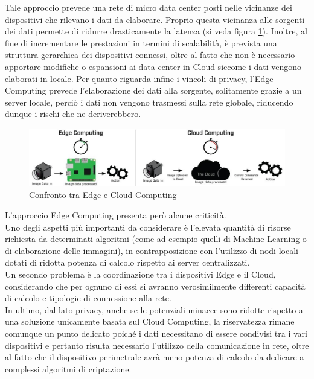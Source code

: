 Tale approccio prevede una rete di micro data center posti nelle vicinanze dei dispositivi che rilevano i dati da elaborare. Proprio questa vicinanza alle sorgenti dei dati permette di ridurre drasticamente la latenza (si veda figura \ref{edgevs}). Inoltre, al fine di incrementare le prestazioni in termini di scalabilità, è prevista una struttura gerarchica dei dispositivi connessi, oltre al fatto che non è necessario apportare modifiche o espansioni ai data center in Cloud siccome i dati vengono elaborati in locale. Per quanto riguarda infine i vincoli di privacy, l'Edge Computing prevede l'elaborazione dei dati alla sorgente, solitamente grazie a un server locale, perciò i dati non vengono trasmessi sulla rete globale, riducendo dunque i rischi che ne deriverebbero.
\begin{figure}[H]
	\centering
	\includegraphics[width=\linewidth, height= 0.15 \textheight]{pics/edgevscloud.jpeg}
	\caption{Confronto tra Edge e Cloud Computing}
	\label{edgevs}
\end{figure}
L'approccio Edge Computing presenta però alcune criticità.\\
Uno degli aspetti più importanti da considerare è l'elevata quantità di risorse richiesta da determinati algoritmi (come ad esempio quelli di Machine Learning o di elaborazione delle immagini), in contrapposizione con l'utilizzo di nodi locali dotati di ridotta potenza di calcolo rispetto ai server centralizzati.\\
Un secondo problema è la coordinazione tra i dispositivi Edge e il Cloud, considerando che per ognuno di essi si avranno verosimilmente differenti capacità di calcolo e tipologie di connessione alla rete.\\
In ultimo, dal lato privacy, anche se le potenziali minacce sono ridotte rispetto a una soluzione unicamente basata sul Cloud Computing, la riservatezza rimane comunque un punto delicato poiché i dati necessitano di essere condivisi tra i vari dispositivi e pertanto risulta necessario l'utilizzo della comunicazione in rete, oltre al fatto che il dispositivo perimetrale avrà meno potenza di calcolo da dedicare a complessi algoritmi di criptazione.\\
